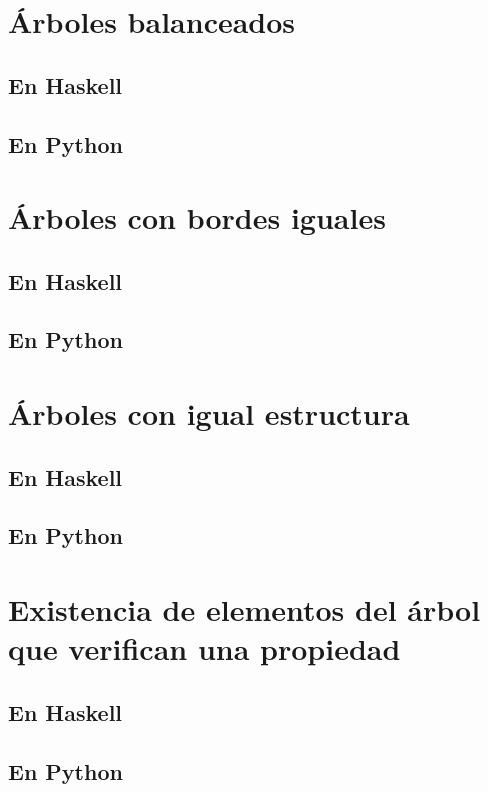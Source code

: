 \documentclass[a4paper,12pt,twoside]{book}
\begin{document}
\section{Árboles balanceados}
\subsection{En Haskell}
\subsection{En Python}

\section{Árboles con bordes iguales}
\subsection{En Haskell}
\subsection{En Python}

\section{Árboles con igual estructura}
\subsection{En Haskell}
\subsection{En Python}

\section{Existencia de elementos del árbol que verifican una propiedad}
\subsection{En Haskell}
\subsection{En Python}
\end{document}

